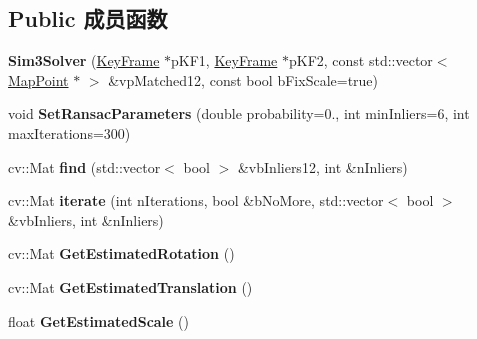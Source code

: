\subsection*{Public 成员函数}
\begin{DoxyCompactItemize}
\item 
\hypertarget{classORB__SLAM2_1_1Sim3Solver_ade0519fb4d34edfdb18fc103a03e99e1}{{\bfseries Sim3\-Solver} (\hyperlink{classORB__SLAM2_1_1KeyFrame}{Key\-Frame} $\ast$p\-K\-F1, \hyperlink{classORB__SLAM2_1_1KeyFrame}{Key\-Frame} $\ast$p\-K\-F2, const std\-::vector$<$ \hyperlink{classORB__SLAM2_1_1MapPoint}{Map\-Point} $\ast$ $>$ \&vp\-Matched12, const bool b\-Fix\-Scale=true)}\label{classORB__SLAM2_1_1Sim3Solver_ade0519fb4d34edfdb18fc103a03e99e1}

\item 
\hypertarget{classORB__SLAM2_1_1Sim3Solver_ab90d591f1b9eac3d846efd35c2c04920}{void {\bfseries Set\-Ransac\-Parameters} (double probability=0., int min\-Inliers=6, int max\-Iterations=300)}\label{classORB__SLAM2_1_1Sim3Solver_ab90d591f1b9eac3d846efd35c2c04920}

\item 
\hypertarget{classORB__SLAM2_1_1Sim3Solver_a34ba62d5d8033ab12a811c241f30544b}{cv\-::\-Mat {\bfseries find} (std\-::vector$<$ bool $>$ \&vb\-Inliers12, int \&n\-Inliers)}\label{classORB__SLAM2_1_1Sim3Solver_a34ba62d5d8033ab12a811c241f30544b}

\item 
\hypertarget{classORB__SLAM2_1_1Sim3Solver_ae07cddad85e41611bd454f8026de31a6}{cv\-::\-Mat {\bfseries iterate} (int n\-Iterations, bool \&b\-No\-More, std\-::vector$<$ bool $>$ \&vb\-Inliers, int \&n\-Inliers)}\label{classORB__SLAM2_1_1Sim3Solver_ae07cddad85e41611bd454f8026de31a6}

\item 
\hypertarget{classORB__SLAM2_1_1Sim3Solver_a9cf5646f2530a074e30320ae5cf1cb4b}{cv\-::\-Mat {\bfseries Get\-Estimated\-Rotation} ()}\label{classORB__SLAM2_1_1Sim3Solver_a9cf5646f2530a074e30320ae5cf1cb4b}

\item 
\hypertarget{classORB__SLAM2_1_1Sim3Solver_a27f28d7708a7215279751e592a17d0d5}{cv\-::\-Mat {\bfseries Get\-Estimated\-Translation} ()}\label{classORB__SLAM2_1_1Sim3Solver_a27f28d7708a7215279751e592a17d0d5}

\item 
\hypertarget{classORB__SLAM2_1_1Sim3Solver_a3942b204d02957269bad6a00c03a1e4b}{float {\bfseries Get\-Estimated\-Scale} ()}\label{classORB__SLAM2_1_1Sim3Solver_a3942b204d02957269bad6a00c03a1e4b}

\end{DoxyCompactItemize}
